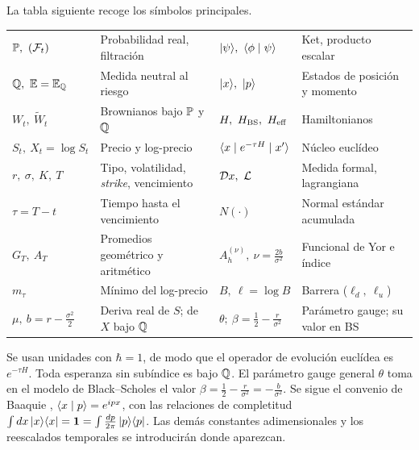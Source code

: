 La tabla siguiente recoge los símbolos principales.
\begin{center}
\footnotesize
\renewcommand{\arraystretch}{1.15}
\setlength{\tabcolsep}{4pt}
\begin{tabular}{@{}ll|ll@{}}
\toprule
$\PP,\ (\F_t)$ & Probabilidad real, filtración &
$\ket{\psi},\ \braket{\phi}{\psi}$ & Ket, producto escalar \\
$\mathbb{Q},\ \mathbb{E} = \mathbb{E}_{\mathbb{Q}}$ & Medida neutral al riesgo &
$\ket{x},\ \ket{p}$ & Estados de posición y momento \\
$W_t,\ \widetilde W_t$ & Brownianos bajo $\mathbb{P}$ y $\mathbb{Q}$ &
$H,\ \Hbs,\ \Heff$ & Hamiltonianos \\
$S_t,\ X_t = \log S_t$ & Precio y log-precio &
$\langle x \mid e^{-\tau H} \mid x' \rangle$ & Núcleo euclídeo \\
$r,\ \sigma,\ K,\ T$ & Tipo, volatilidad, \emph{strike}, vencimiento &
$\Dpath x,\ \Lag$ & Medida formal, lagrangiana \\
$\tau = T - t$ & Tiempo hasta el vencimiento &
$N(\cdot)$ & Normal estándar acumulada \\
$G_T,\ A_T$ & Promedios geométrico y aritmético &
$A_h^{(\nu)},\ \nu = \frac{2b}{\sigma^2}$ & Funcional de Yor e índice \\
$m_\tau$ & Mínimo del log-precio &
$B,\ \ell = \log B$ & Barrera ($\ell_d,\ \ell_u$) \\
$\mu,\ b = r - \frac{\sigma^2}{2}$ & Deriva real de $S$; de $X$ bajo $\mathbb{Q}$ &
$\theta;\ \beta = \frac{1}{2} - \frac{r}{\sigma^2}$
 & Parámetro gauge; su valor en BS \\
\bottomrule
\end{tabular}
\end{center}

\noindent Se usan unidades con $\hbar = 1$, de modo que el operador de
evolución euclídea es $e^{-\tau H}$. Toda esperanza sin subíndice es
bajo $\mathbb{Q}$. El parámetro gauge general $\theta$ toma en el modelo de
Black--Scholes el valor
$\beta = \frac{1}{2} - \frac{r}{\sigma^2} = -\frac{b}{\sigma^2}$. Se
sigue el convenio de Baaquie \cite{baaquie2004},
$\langle x \mid p \rangle = e^{ipx}$, con las relaciones de completitud
$\int dx\,| x \rangle\langle x | = \mathbf{1} = \int \frac{dp}{2\pi}\,| p \rangle\langle p |$.
Las demás constantes adimensionales y los reescalados temporales se
introducirán donde aparezcan.
